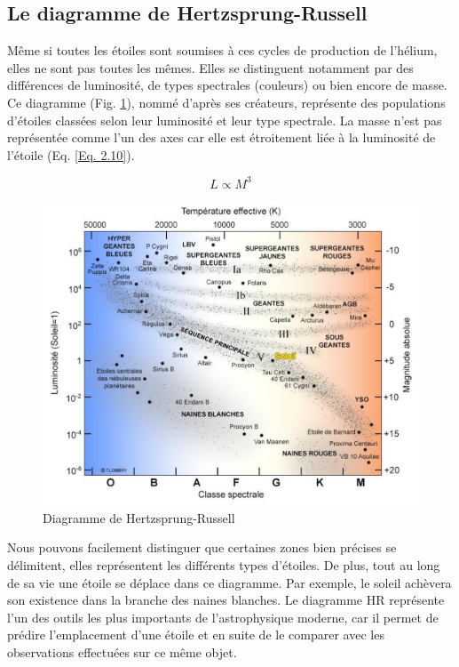 \subsection{Le diagramme de Hertzsprung-Russell}\label{2.1.3}

Même si toutes les étoiles sont soumises à ces cycles de production de l’hélium, elles ne sont pas toutes les mêmes. Elles se distinguent notamment par des différences de luminosité, de types spectrales (couleurs) ou bien encore de masse. Ce diagramme (Fig. \ref{Fig. 2.2}), nommé d’après ses créateurs, représente des populations d’étoiles classées selon leur luminosité et leur type spectrale. La masse n’est pas représentée comme l’un des axes car elle est étroitement liée à la luminosité de l’étoile (Eq. \ref{Eq. 2.10}).

\begin{center}
\begin{equation}L \propto M^{3}\label{Eq. 2.10}\end{equation}
\end{center}\newpage

\begin{figure}[H]\vspace{1cm}
	\centering
	\includegraphics[scale=0.4]{images/hr-diagram}
	\caption[Diagramme de Hertzsprung-Russell\newline\url{http://www.astrosurf.com/luxorion/vie-etoiles2.html}]{Diagramme de Hertzsprung-Russell}
	\label{Fig. 2.2}
\end{figure}\bigskip

Nous pouvons facilement distinguer que certaines zones bien précises se délimitent, elles représentent les différents types d’étoiles. De plus, tout au long de sa vie une étoile se déplace dans ce diagramme. Par exemple, le soleil achèvera son existence dans la branche des naines blanches. Le diagramme HR représente l’un des outils les plus importants de l’astrophysique moderne, car il permet de prédire l’emplacement d’une étoile et en suite de le comparer avec les observations effectuées sur ce même objet.\bigskip

